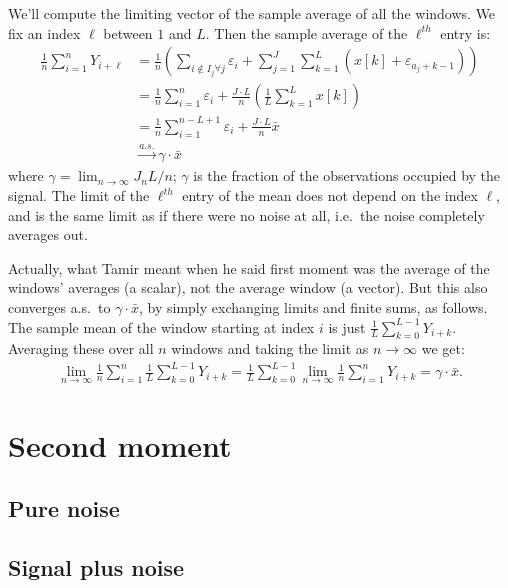 \documentclass{article}
\theoremstyle{thm}
\theoremstyle{definition}
\newcommand{\ep}{\varepsilon}
\begin{document}
We'll compute the limiting vector of the sample average of all the windows. We fix an index $\ell$ between $1$ and $L$. Then the sample average of the $\ell^{th}$ entry is:
%
\begin{align}
%
    \frac{1}{n} \sum_{i=1}^n Y_{i+\ell} &=
    \frac{1}{n}  \left( \sum_{i \notin I_j \forall j} \ep_i 
                  + \sum_{j=1}^J \sum_{k=1}^L (x[k] + \ep_{a_j + k-1} ) \right) 
    \nonumber \\
%
        &= \frac{1}{n}\sum_{i=1}^{n} \ep_i 
                  + \frac{J \cdot L}{n} \left(\frac{1}{L} \sum_{k=1}^L x[k]\right) 
    \nonumber \\
        &= \frac{1}{n}\sum_{i=1}^{n-L+1} \ep_i 
                  + \frac{J \cdot L}{n} \bar{x}       
     \nonumber \\
%
        &\operatorname*{\longrightarrow}^{a.s.}  \gamma  \cdot \bar{x}
%
\end{align}
%
where $\gamma = \lim_{n\to\infty} J_n L / n$; $\gamma$ is the fraction of the observations occupied by the signal. The limit of the $\ell^{th}$ entry of the mean does not depend on the index $\ell$, and is the same limit as if there were no noise at all, i.e.\ the noise completely averages out.

Actually, what Tamir meant when he said first moment was the average of the windows' averages (a scalar), not the average window (a vector). But this also converges a.s.\ to $\gamma \cdot \bar{x}$, by simply exchanging limits and finite sums, as follows. The sample mean of the window starting at index $i$ is just $\frac{1}{L} \sum_{k=0}^{L-1} Y_{i+k}$. Averaging these over all $n$ windows and taking the limit as $n \to \infty$ we get:
%
\begin{align}
%
    \lim_{n\to\infty} \frac{1}{n} \sum_{i=1}^n \frac{1}{L} \sum_{k=0}^{L-1} Y_{i+k}
    =  \frac{1}{L} \sum_{k=0}^{L-1} \lim_{n\to\infty} \frac{1}{n} \sum_{i=1}^n Y_{i+k}
    = \gamma \cdot \bar{x}.
%
\end{align}







\section{Second moment}

\subsection{Pure noise}



\subsection{Signal plus noise}
\end{document}
